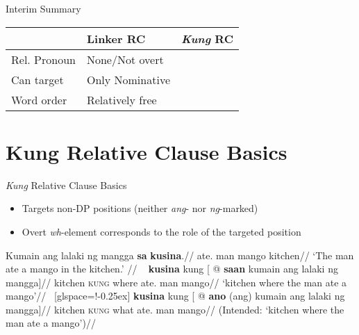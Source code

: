 \documentclass[pdf]{beamer}
\newcommand{\g}[1]{\textsc{#1}}
\newcommand{\texthl}[1]{\textcolor{cyan!75!blue}{\textbf{#1}}}
\begin{document}
\begin{frame}{Interim Summary}
  \begin{table}
    \begin{tabular}{lll}\toprule
                    & Linker RC & \textit{Kung} RC\\\midrule
      Rel. Pronoun  & None/Not overt \\
      Can target    & Only Nominative \\
      Word order    & Relatively free \\
      \bottomrule
    \end{tabular}
  \end{table}
\end{frame}


\section[Kung RC Basics]{Kung Relative Clause Basics}

\begin{frame}{\textit{Kung} Relative Clause Basics}
  \begin{itemize}
    \item Targets non-DP positions (neither \textit{ang}- nor \textit{ng}-marked)
    \item Overt \textit{wh}-element corresponds to the role of the targeted position
  \end{itemize}
  \ex\begingl
    \gla  Kumain ang lalaki ng mangga \texthl{sa} \texthl{kusina}.//
    \glb  ate.\Av{} \Nom{} man \Gen{} mango \Obl{} kitchen//
    \glft `The man ate a mango in the kitchen.'
          //
  \endgl
  \xe\vspace{-1em}\pause
  \ex~\begingl
    \gla  \texthl{kusina} kung [ @ \texthl{saan} kumain ang lalaki ng mangga]//
    \glb  kitchen \g{kung} where ate.\Av{} \Nom{} man \Gen{} mango//
    \glft `kitchen where the man ate a mango'//
  \endgl
  \xe
  \ex~[glspace=!-0.25ex]\ljudge{*}\begingl
    \gla  \texthl{kusina} kung [ @ \texthl{ano} (ang) kumain ang lalaki ng mangga]//
    \glb  kitchen \g{kung} what \Nom{} ate.\Av{} \Nom{} man \Gen{} mango//
    \glft (Intended: `kitchen where the man ate a mango')//
  \endgl
  \xe
\end{frame}
\end{document}
